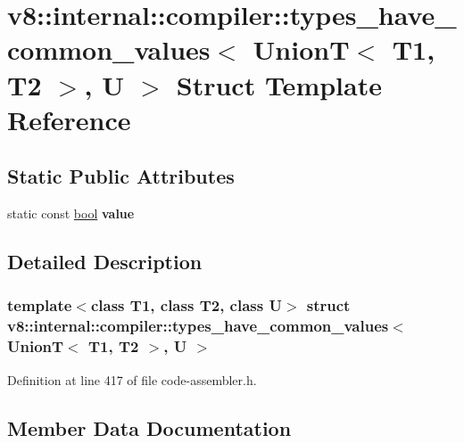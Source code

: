 \hypertarget{structv8_1_1internal_1_1compiler_1_1types__have__common__values_3_01UnionT_3_01T1_00_01T2_01_4_00_01U_01_4}{}\section{v8\+:\+:internal\+:\+:compiler\+:\+:types\+\_\+have\+\_\+common\+\_\+values$<$ UnionT$<$ T1, T2 $>$, U $>$ Struct Template Reference}
\label{structv8_1_1internal_1_1compiler_1_1types__have__common__values_3_01UnionT_3_01T1_00_01T2_01_4_00_01U_01_4}
\subsection*{Static Public Attributes}
\begin{DoxyCompactItemize}
\item 
static const \mbox{\hyperlink{classbool}{bool}} {\bfseries value}
\end{DoxyCompactItemize}


\subsection{Detailed Description}
\subsubsection*{template$<$class T1, class T2, class U$>$\newline
struct v8\+::internal\+::compiler\+::types\+\_\+have\+\_\+common\+\_\+values$<$ Union\+T$<$ T1, T2 $>$, U $>$}



Definition at line 417 of file code-\/assembler.\+h.



\subsection{Member Data Documentation}
\mbox{\label{structv8_1_1internal_1_1compiler_1_1types__have__common__values_3_01UnionT_3_01T1_00_01T2_01_4_00_01U_01_4_acf615dc50a7cd0b8a91d7cb04c26c7c3}} 
